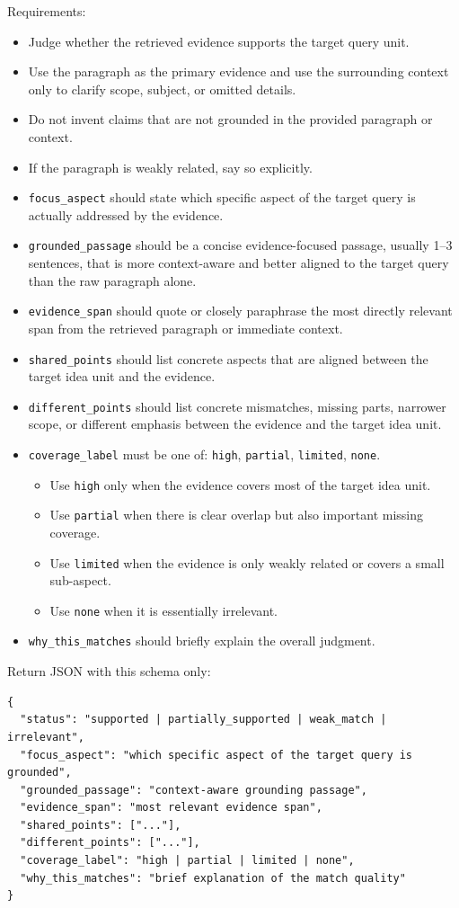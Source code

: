 \begin{tcolorbox}
Requirements:
\begin{itemize}\small
\item Judge whether the retrieved evidence supports the target query unit.
\item Use the paragraph as the primary evidence and use the surrounding context only to clarify scope, subject, or omitted details.
\item Do not invent claims that are not grounded in the provided paragraph or context.
\item If the paragraph is weakly related, say so explicitly.
\item \texttt{focus\_aspect} should state which specific aspect of the target query is actually addressed by the evidence.
\item \texttt{grounded\_passage} should be a concise evidence-focused passage, usually 1--3 sentences, that is more context-aware and better aligned to the target query than the raw paragraph alone.
\item \texttt{evidence\_span} should quote or closely paraphrase the most directly relevant span from the retrieved paragraph or immediate context.
\item \texttt{shared\_points} should list concrete aspects that are aligned between the target idea unit and the evidence.
\item \texttt{different\_points} should list concrete mismatches, missing parts, narrower scope, or different emphasis between the evidence and the target idea unit.
\item \texttt{coverage\_label} must be one of: \texttt{high}, \texttt{partial}, \texttt{limited}, \texttt{none}.
  \begin{itemize}\small
  \item Use \texttt{high} only when the evidence covers most of the target idea unit.
  \item Use \texttt{partial} when there is clear overlap but also important missing coverage.
  \item Use \texttt{limited} when the evidence is only weakly related or covers a small sub-aspect.
  \item Use \texttt{none} when it is essentially irrelevant.
  \end{itemize}
\item \texttt{why\_this\_matches} should briefly explain the overall judgment.
\end{itemize}

Return JSON with this schema only:
\begin{verbatim}
{
  "status": "supported | partially_supported | weak_match | irrelevant",
  "focus_aspect": "which specific aspect of the target query is grounded",
  "grounded_passage": "context-aware grounding passage",
  "evidence_span": "most relevant evidence span",
  "shared_points": ["..."],
  "different_points": ["..."],
  "coverage_label": "high | partial | limited | none",
  "why_this_matches": "brief explanation of the match quality"
}
\end{verbatim}
\end{tcolorbox}


